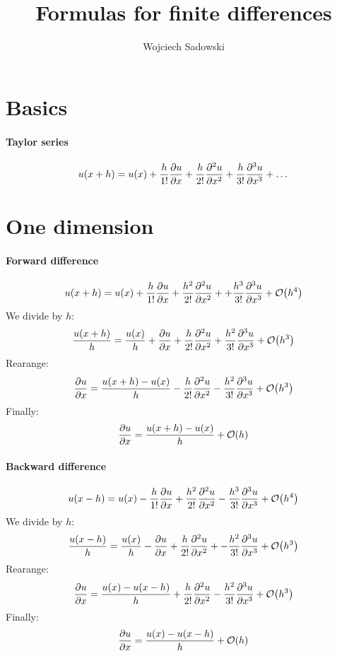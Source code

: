 \documentclass{article}
\title{Formulas for finite differences}
\author{Wojciech Sadowski}
\begin{document}
\maketitle
\section{Basics}
\paragraph{Taylor series}
\[
  u(x + h) = u(x) 
  + \frac{h}{1!}\pdv{u}{x} 
  + \frac{h}{2!}\pdv[2]{u}{x} 
  + \frac{h}{3!}\pdv[3]{u}{x} + \dots
\]

\section{One dimension}
\paragraph{Forward difference}
\[
  u(x + h) = u(x) 
  + \frac{h}{1!}\pdv{u}{x} 
  + \frac{h^2}{2!}\pdv[2]{u}{x} +
  + \frac{h^3}{3!}\pdv[3]{u}{x} +
  \mathcal{O}\qty(h^4)
\]
We divide by \(h\):
\[
  \frac{u(x + h)}{h} = \frac{u(x)}{h} 
  + \pdv{u}{x} 
  + \frac{h}{2!}\pdv[2]{u}{x} 
  + \frac{h^2}{3!}\pdv[3]{u}{x} 
  + \mathcal{O}\qty(h^3)
\]
Rearange:
\begin{equation}\label{eq::forward}
   \pdv{u}{x} 
   = \frac{u(x + h) - u(x)}{h}  
  - \frac{h}{2!}\pdv[2]{u}{x} 
  - \frac{h^2}{3!}\pdv[3]{u}{x} 
  + \mathcal{O}\qty(h^3)
\end{equation}
Finally:
\[
   \pdv{u}{x} 
   = \frac{u(x + h) - u(x)}{h}  + \mathcal{O}\qty(h)
\]

\paragraph{Backward difference}
\[
  u(x - h) = u(x) 
  - \frac{h}{1!}\pdv{u}{x} 
  + \frac{h^2}{2!}\pdv[2]{u}{x} 
  - \frac{h^3}{3!}\pdv[3]{u}{x} 
  + \mathcal{O}\qty(h^4)
\]
We divide by \(h\):
\[
  \frac{u(x - h)}{h} = \frac{u(x)}{h} 
  -\pdv{u}{x} 
  + \frac{h}{2!}\pdv[2]{u}{x} +
  - \frac{h^2}{3!}\pdv[3]{u}{x} +
  \mathcal{O}\qty(h^3)
\]
Rearange:
\begin{equation}\label{eq::backward}
   \pdv{u}{x} 
   = \frac{u(x) - u(x-h)}{h}  
  + \frac{h}{2!}\pdv[2]{u}{x} 
  - \frac{h^2}{3!}\pdv[3]{u}{x} 
  + \mathcal{O}\qty(h^3)
\end{equation}
Finally:
\[
   \pdv{u}{x} 
   = \frac{u(x) - u(x - h)}{h}  + \mathcal{O}\qty(h)
\]
\end{document}
